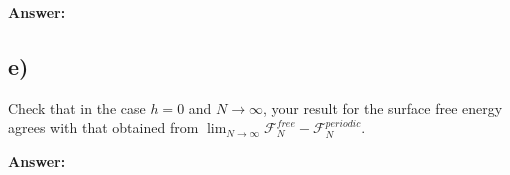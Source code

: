 \documentclass[a4paper]{article}
\newcommand{\newparagraph}{\vspace{.5cm}\noindent}
\begin{document}
\newparagraph
\textbf{Answer:}
\subsection*{e)}
Check that in the case $h = 0$ and $N\to\infty$, your result for the surface free energy agrees with that obtained from $\lim_{N\to\infty}\mathcal{F}_N^{free}- \mathcal{F}_N^{periodic}$.

\newparagraph
\textbf{Answer:}
\end{document}
